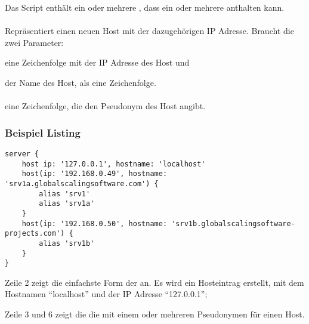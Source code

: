 Das Script enthält ein oder mehrere , dass ein oder mehrere
 anthalten kann.

\paragraph{}

Repräsentiert einen neuen Host mit der dazugehörigen IP Adresse. Braucht die zwei
Parameter:

\begin{asparadesc}
\item[\code{ip}] eine Zeichenfolge mit der IP Adresse des Host und
\item[\code{hostname}] der Name des Host, als eine Zeichenfolge.
\end{asparadesc}

\paragraph{}

eine Zeichenfolge, die den Pseudonym des Host angibt.

\subsubsection*{Beispiel Listing}

\begin{lstlisting}[style=Java, caption=Beispiel Hosts Script]
server {
	host ip: '127.0.0.1', hostname: 'localhost'
	host(ip: '192.168.0.49', hostname: 'srv1a.globalscalingsoftware.com') {
		alias 'srv1'
		alias 'srv1a'
	}
	host(ip: '192.168.0.50', hostname: 'srv1b.globalscalingsoftware-projects.com') {
		alias 'srv1b'
	}
}
\end{lstlisting}

\begin{asparadesc}
\item[Zeile 2] zeigt die einfachste Form der  an. Es wird ein Hosteintrag
erstellt, mit dem Hostnamen ``localhost'' und der IP Adresse ``127.0.0.1'';
\item[Zeile 3 und 6] zeigt die die  mit einem oder mehreren Pseudonymen für einen Host.
\end{asparadesc}

